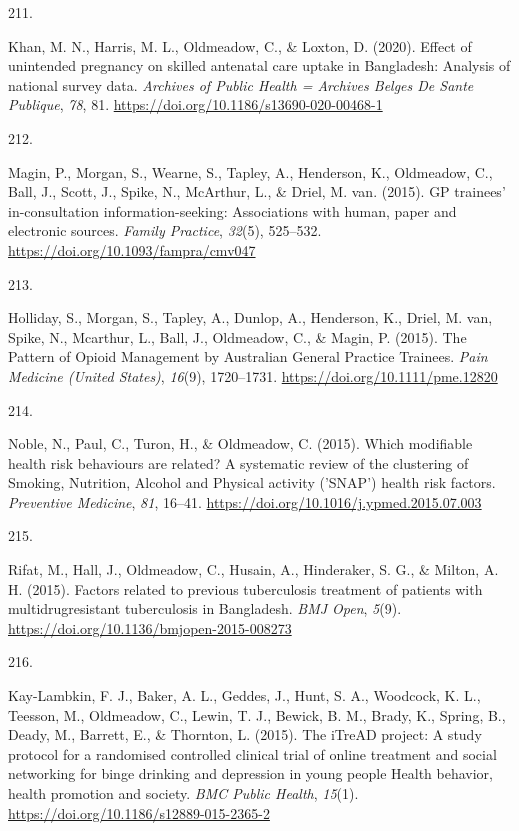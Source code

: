 \documentclass[11pt, a4paper]{awesome-cv}
\newlength{\csllabelwidth}
\newcommand{\CSLLeftMargin}[1]{\parbox[t]{\csllabelwidth}{#1}}
\newcommand{\CSLRightInline}[1]{\parbox[t]{\linewidth - \csllabelwidth}{#1}}
\begin{document}
\leavevmode\hypertarget{ref-khan_effect_2020}{}%
\CSLLeftMargin{211. }
\CSLRightInline{Khan, M. N., Harris, M. L., Oldmeadow, C., \& Loxton, D.
(2020). Effect of unintended pregnancy on skilled antenatal care uptake
in Bangladesh: Analysis of national survey data. \emph{Archives of
Public Health = Archives Belges De Sante Publique}, \emph{78}, 81.
\url{https://doi.org/10.1186/s13690-020-00468-1}}

\leavevmode\hypertarget{ref-magin_gp_2015}{}%
\CSLLeftMargin{212. }
\CSLRightInline{Magin, P., Morgan, S., Wearne, S., Tapley, A.,
Henderson, K., Oldmeadow, C., Ball, J., Scott, J., Spike, N., McArthur,
L., \& Driel, M. van. (2015). GP trainees' in-consultation
information-seeking: Associations with human, paper and electronic
sources. \emph{Family Practice}, \emph{32}(5), 525--532.
\url{https://doi.org/10.1093/fampra/cmv047}}

\leavevmode\hypertarget{ref-holliday_pattern_2015}{}%
\CSLLeftMargin{213. }
\CSLRightInline{Holliday, S., Morgan, S., Tapley, A., Dunlop, A.,
Henderson, K., Driel, M. van, Spike, N., Mcarthur, L., Ball, J.,
Oldmeadow, C., \& Magin, P. (2015). The Pattern of Opioid Management by
Australian General Practice Trainees. \emph{Pain Medicine (United
States)}, \emph{16}(9), 1720--1731.
\url{https://doi.org/10.1111/pme.12820}}

\leavevmode\hypertarget{ref-noble_which_2015}{}%
\CSLLeftMargin{214. }
\CSLRightInline{Noble, N., Paul, C., Turon, H., \& Oldmeadow, C. (2015).
Which modifiable health risk behaviours are related? A systematic review
of the clustering of Smoking, Nutrition, Alcohol and Physical activity
('SNAP') health risk factors. \emph{Preventive Medicine}, \emph{81},
16--41. \url{https://doi.org/10.1016/j.ypmed.2015.07.003}}

\leavevmode\hypertarget{ref-rifat_factors_2015}{}%
\CSLLeftMargin{215. }
\CSLRightInline{Rifat, M., Hall, J., Oldmeadow, C., Husain, A.,
Hinderaker, S. G., \& Milton, A. H. (2015). Factors related to previous
tuberculosis treatment of patients with multidrugresistant tuberculosis
in Bangladesh. \emph{BMJ Open}, \emph{5}(9).
\url{https://doi.org/10.1136/bmjopen-2015-008273}}

\leavevmode\hypertarget{ref-kay-lambkin_itread_2015}{}%
\CSLLeftMargin{216. }
\CSLRightInline{Kay-Lambkin, F. J., Baker, A. L., Geddes, J., Hunt, S.
A., Woodcock, K. L., Teesson, M., Oldmeadow, C., Lewin, T. J., Bewick,
B. M., Brady, K., Spring, B., Deady, M., Barrett, E., \& Thornton, L.
(2015). The iTreAD project: A study protocol for a randomised controlled
clinical trial of online treatment and social networking for binge
drinking and depression in young people Health behavior, health
promotion and society. \emph{BMC Public Health}, \emph{15}(1).
\url{https://doi.org/10.1186/s12889-015-2365-2}}
\end{document}
